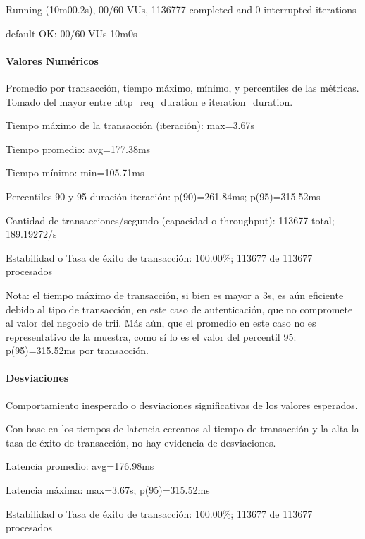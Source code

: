 \documentclass[
  paper=a4,
  ,captions=tableheading
]{scrartcl}
\renewenvironment{quote}{\begin{customblockquote}\list{}{\rightmargin=0em\leftmargin=0em}%
\item\relax\color{blockquote-text}\ignorespaces}{\unskip\unskip\endlist\end{customblockquote}}
\begin{document}
\begin{quote}
Running (10m00.2s), 00/60 VUs, 1136777 completed and 0 interrupted
iterations

default OK: 00/60 VUs 10m0s
\end{quote}

\paragraph{Valores Numéricos}\label{sec:valores-numuxe9ricos-1}

Promedio por transacción, tiempo máximo, mínimo, y percentiles de las
métricas. Tomado del mayor entre http\_req\_duration e
iteration\_duration.

\begin{quote}
Tiempo máximo de la transacción (iteración): max=3.67s

Tiempo promedio: avg=177.38ms

Tiempo mínimo: min=105.71ms

Percentiles 90 y 95 duración iteración: p(90)=261.84ms; p(95)=315.52ms

Cantidad de transacciones/segundo (capacidad o throughput): 113677
total; 189.19272/s

Estabilidad o Tasa de éxito de transacción: 100.00\%; 113677 de 113677
procesados
\end{quote}

Nota: el tiempo máximo de transacción, si bien es mayor a 3s, es aún
eficiente debido al tipo de transacción, en este caso de autenticación,
que no compromete al valor del negocio de trii. Más aún, que el promedio
en este caso no es representativo de la muestra, como sí lo es el valor
del percentil 95: p(95)=315.52ms por transacción.

\paragraph{Desviaciones}\label{sec:desviaciones-1}

Comportamiento inesperado o desviaciones significativas de los valores
esperados.

Con base en los tiempos de latencia cercanos al tiempo de transacción y
la alta la tasa de éxito de transacción, no hay evidencia de
desviaciones.

\begin{quote}
Latencia promedio: avg=176.98ms

Latencia máxima: max=3.67s; p(95)=315.52ms

Estabilidad o Tasa de éxito de transacción: 100.00\%; 113677 de 113677
procesados
\end{quote}
\end{document}
